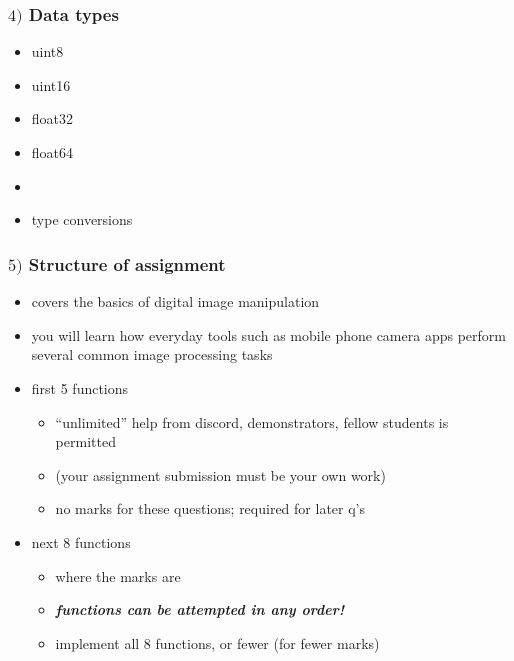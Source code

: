 \documentclass[english,14pt]{beamer}
\begin{document}

\begin{frame}[fragile]

\frametitle{$4)$ Data types}

\begin{itemize}
	\item uint8
	\item uint16
	\item float32
	\item float64
	\item[]
	\item type conversions
		
\end{itemize}

\end{frame}


\begin{frame}[fragile]

\frametitle{$5)$ Structure of assignment}

\begin{itemize}
	\item covers the basics of digital image manipulation
	\item you will learn how everyday tools such as mobile phone camera apps perform several common image processing tasks
	\item first 5 functions
	\begin{itemize}
		\item ``unlimited'' help from discord, demonstrators, fellow students is permitted
		\item[] (your assignment submission must be your own work)
		\item no marks for these questions; required for later q's
	\end{itemize}
	\item next 8 functions
	\begin{itemize}
		\item where the marks are
		\item \emph{\textbf{functions can be attempted in any order! }}
		\item implement all 8 functions, or fewer (for fewer marks)
	\end{itemize}
\end{itemize}

\end{frame}
\end{document}

